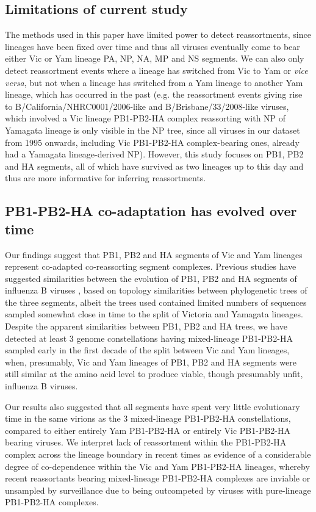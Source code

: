 \documentclass[11pt,oneside,letterpaper]{article}
\begin{document}
\subsection*{Limitations of current study}
The methods used in this paper have limited power to detect reassortments, since lineages have been fixed over time and thus all viruses eventually come to bear either Vic or Yam lineage PA, NP, NA, MP and NS segments.
We can also only detect reassortment events where a lineage has switched from Vic to Yam or \textit{vice versa}, but not when a lineage has switched from a Yam lineage to another Yam lineage, which has occurred in the past (e.g. the reassortment events giving rise to B/California/NHRC0001/2006-like and B/Brisbane/33/2008-like viruses, which involved a Vic lineage PB1-PB2-HA complex reassorting with NP of Yamagata lineage is only visible in the NP tree, since all viruses in our dataset from 1995 onwards, including Vic PB1-PB2-HA complex-bearing ones, already had a Yamagata lineage-derived NP).
However, this study focuses on PB1, PB2 and HA segments, all of which have survived as two lineages up to this day and thus are more informative for inferring reassortments.

\subsection*{PB1-PB2-HA co-adaptation has evolved over time}
Our findings suggest that PB1, PB2 and HA segments of Vic and Yam lineages represent co-adapted co-reassorting segment complexes.
Previous studies have suggested similarities between the evolution of PB1, PB2 and HA segments of influenza B viruses \cite{hiromoto2000,lindstrom1999}, based on topology similarities between phylogenetic trees of the three segments, albeit the trees used contained limited numbers of sequences sampled somewhat close in time to the split of Victoria and Yamagata lineages.
Despite the apparent similarities between PB1, PB2 and HA trees, we have detected at least 3 genome constellations having mixed-lineage PB1-PB2-HA sampled early in the first decade of the split between Vic and Yam lineages, when, presumably, Vic and Yam lineages of PB1, PB2 and HA segments were still similar at the amino acid level to produce viable, though presumably unfit, influenza B viruses.

Our results also suggested that all segments have spent very little evolutionary time in the same virions as the 3 mixed-lineage PB1-PB2-HA constellations, compared to either entirely Yam PB1-PB2-HA or entirely Vic PB1-PB2-HA bearing viruses.
We interpret lack of reassortment within the PB1-PB2-HA complex across the lineage boundary in recent times as evidence of a considerable degree of co-dependence within the Vic and Yam PB1-PB2-HA lineages, whereby recent reassortants bearing mixed-lineage PB1-PB2-HA complexes are inviable or unsampled by surveillance due to being outcompeted by viruses with pure-lineage PB1-PB2-HA complexes.
\end{document}
